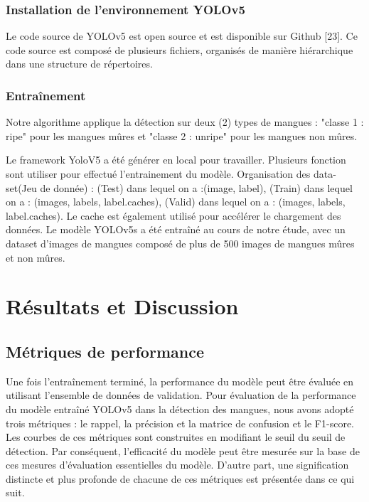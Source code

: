 \documentclass{article}
\begin{document}
	\subsubsection{Installation de l’environnement YOLOv5}
	Le code source de YOLOv5 est open source et est disponible sur Github [23]. Ce code source
	est composé de plusieurs fichiers, organisés de manière hiérarchique dans une structure de répertoires.
	
	\subsubsection{Entraînement}
	Notre algorithme applique la détection
	sur deux (2) types de mangues : "classe 1 : ripe" pour les mangues mûres et "classe 2 : unripe" pour
	les mangues non mûres.
	
	Le framework YoloV5 a été générer en local pour travailler. Plusieurs fonction sont utiliser pour effectué l'entrainement du modèle. 
	Organisation des data-set(Jeu de donnée) : (Test) dans lequel on a :(image, label), (Train) dans lequel on a : (images, labels, label.caches), (Valid) dans lequel on a : (images, labels, label.caches).
	Le cache est également utilisé pour accélérer le chargement des données. Le modèle YOLOv5s a été
	entraîné au cours de notre étude, avec un dataset d’images de mangues composé de plus de 500
	images de mangues mûres et non mûres.
	
	\section{Résultats et Discussion}
	
	\subsection{Métriques de performance}
	Une fois l’entraînement terminé, la performance du modèle peut être évaluée en utilisant
	l’ensemble de données de validation. Pour évaluation de la performance du modèle entraîné YOLOv5
	dans la détection des mangues, nous avons adopté trois métriques : le rappel, la précision et la matrice
	de confusion et le F1-score. Les courbes de ces métriques sont construites en modifiant le seuil du seuil
	de détection. Par conséquent, l’efficacité du modèle peut être mesurée sur la base de ces mesures
	d’évaluation essentielles du modèle. D’autre part, une signification distincte et plus profonde de
	chacune de ces métriques est présentée dans ce qui suit.
	
\end{document}
